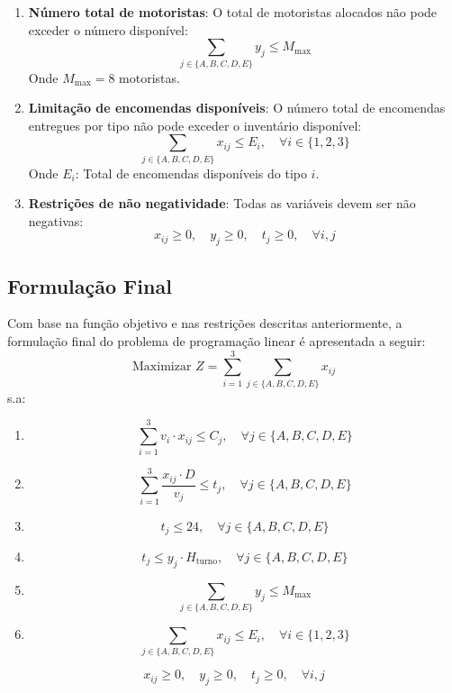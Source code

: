 \begin{enumerate}
\begin{itemize}
    \end{itemize}
    \item \textbf{Número total de motoristas}: O total de motoristas alocados não pode exceder o número disponível:
    \[
        \sum_{j \in \{A, B, C, D, E\}} y_j \leq M_{\text{max}}
    \]
    Onde \( M_{\text{max}} = 8 \) motoristas.
    \item \textbf{Limitação de encomendas disponíveis}: O número total de encomendas entregues por tipo não pode exceder o inventário disponível:
    \[
        \sum_{j \in \{A, B, C, D, E\}} x_{ij} \leq E_i, \quad \forall i \in \{1, 2, 3\}
    \]
    Onde \( E_i \): Total de encomendas disponíveis do tipo \( i \).
    \item \textbf{Restrições de não negatividade}: Todas as variáveis devem ser não negativas:
    \[
        x_{ij} \geq 0, \quad y_j \geq 0, \quad t_j \geq 0, \quad \forall i, j
    \]
\end{enumerate}

\subsection{Formulação Final}\label{subsec:formulacao-final}
Com base na função objetivo e nas restrições descritas anteriormente, a formulação final do problema de programação linear é apresentada a seguir:
\[
    \text{Maximizar } Z = \sum_{i=1}^{3} \sum_{j \in \{A, B, C, D, E\}} x_{ij}
\]
s.a:
\begin{enumerate}
    \item \[
              \sum_{i=1}^{3} v_i \cdot x_{ij} \leq C_j, \quad \forall j \in \{A, B, C, D, E\}
    \]
    \item \[
              \sum_{i=1}^{3} \frac{x_{ij} \cdot D}{v_j} \leq t_j, \quad \forall j \in \{A, B, C, D, E\}
    \]
    \item \[
              t_j \leq 24, \quad \forall j \in \{A, B, C, D, E\}
    \]
    \item \[
              t_j \leq y_j \cdot H_{\text{turno}}, \quad \forall j \in \{A, B, C, D, E\}
    \]
    \item \[
              \sum_{j \in \{A, B, C, D, E\}} y_j \leq M_{\max}
    \]
    \item \[
              \sum_{j \in \{A, B, C, D, E\}} x_{ij} \leq E_i, \quad \forall i \in \{1, 2, 3\}
    \]
\end{enumerate}
\[
    x_{ij} \geq 0, \quad y_j \geq 0, \quad t_j \geq 0, \quad \forall i, j
\]